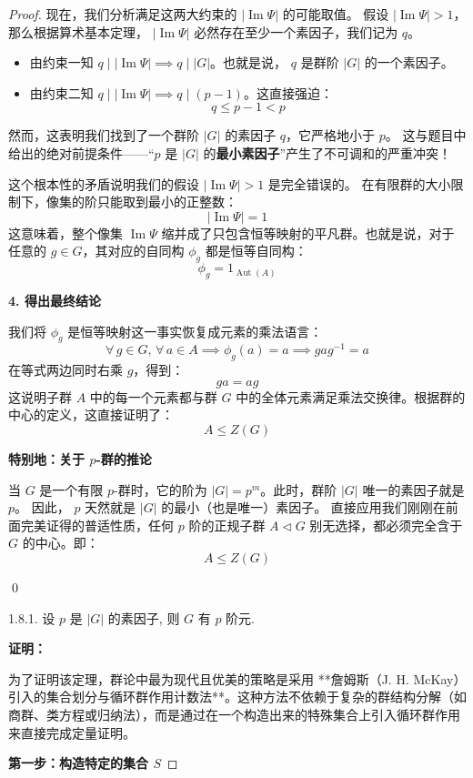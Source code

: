 \documentclass[]{article}
\begin{document}
\begin{proof}
现在，我们分析满足这两大约束的 $|\operatorname{Im}\Psi|$ 的可能取值。
假设 $|\operatorname{Im}\Psi| > 1$，那么根据算术基本定理， $|\operatorname{Im}\Psi|$ 必然存在至少一个素因子，我们记为 $q$。
\begin{itemize}
	\item 由约束一知 $q \mid |\operatorname{Im}\Psi| \implies q \mid |G|$。也就是说， $q$ 是群阶 $|G|$ 的一个素因子。
	\item 由约束二知 $q \mid |\operatorname{Im}\Psi| \implies q \mid (p - 1)$。这直接强迫：
	\[ q \leqslant p - 1 < p \]
\end{itemize}
然而，这表明我们找到了一个群阶 $|G|$ 的素因子 $q$，它严格地小于 $p$。
这与题目中给出的绝对前提条件——“$p$ 是 $|G|$ 的\textbf{最小素因子}”产生了不可调和的严重冲突！

这个根本性的矛盾说明我们的假设 $|\operatorname{Im}\Psi| > 1$ 是完全错误的。
在有限群的大小限制下，像集的阶只能取到最小的正整数：
\[ |\operatorname{Im}\Psi| = 1 \]
这意味着，整个像集 $\operatorname{Im}\Psi$ 缩并成了只包含恒等映射的平凡群。也就是说，对于任意的 $g \in G$，其对应的自同构 $\phi_g$ 都是恒等自同构：
\[ \phi_g = 1_{\operatorname{Aut}(A)} \]

\bigskip
\noindent \textbf{4. 得出最终结论}

我们将 $\phi_g$ 是恒等映射这一事实恢复成元素的乘法语言：
\[ \forall \, g \in G, \, \forall \, a \in A \implies \phi_g(a) = a \implies gag^{-1} = a \]
在等式两边同时右乘 $g$，得到：
\[ ga = ag \]
这说明子群 $A$ 中的每一个元素都与群 $G$ 中的全体元素满足乘法交换律。根据群的中心的定义，这直接证明了：
\[ A \leqslant Z(G) \]

\bigskip
\noindent \textbf{特别地：关于 $p$-群的推论}

当 $G$ 是一个有限 $p$-群时，它的阶为 $|G| = p^m$。此时，群阶 $|G|$ 唯一的素因子就是 $p$。
因此， $p$ 天然就是 $|G|$ 的最小（也是唯一）素因子。
直接应用我们刚刚在前面完美证得的普适性质，任何 $p$ 阶的正规子群 $A \triangleleft G$ 别无选择，都必须完全含于 $G$ 的中心。即：
\[ A \leqslant Z(G) \]

\qed

1.8.1. 设 $p$ 是 $|G|$ 的素因子, 则 $G$ 有 $p$ 阶元. 

\bigskip
\noindent \textbf{证明：} 

为了证明该定理，群论中最为现代且优美的策略是采用 **詹姆斯（J. H. McKay）引入的集合划分与循环群作用计数法**。这种方法不依赖于复杂的群结构分解（如商群、类方程或归纳法），而是通过在一个构造出来的特殊集合上引入循环群作用来直接完成定量证明。

\bigskip
\noindent \textbf{第一步：构造特定的集合 $S$}


\end{proof}
\end{document}
